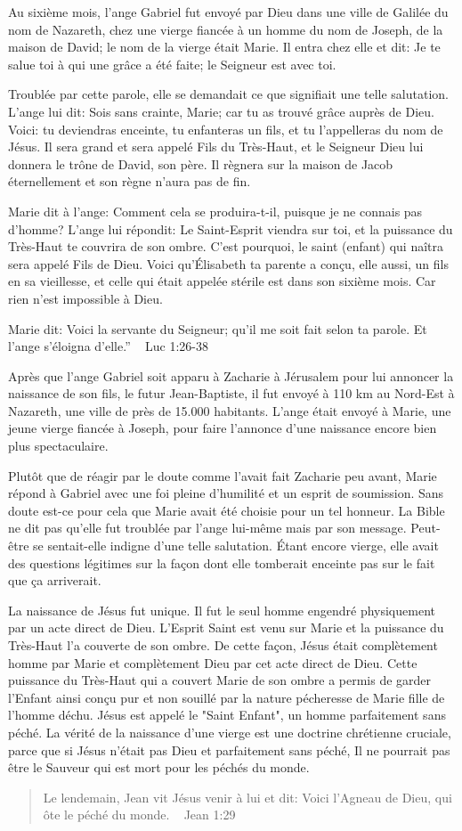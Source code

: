 
\epigraph{Au sixième mois, l’ange Gabriel fut envoyé par Dieu dans une ville de Galilée du nom de Nazareth, chez une vierge fiancée à un homme du nom de Joseph, de la maison de David; le nom de la vierge était Marie. Il entra chez elle et dit: Je te salue toi à qui une grâce a été faite; le Seigneur est avec toi.}{}

Troublée par cette parole, elle se demandait ce que signifiait une telle salutation. L’ange lui dit: Sois sans crainte, Marie; car tu as trouvé grâce auprès de Dieu. Voici: tu deviendras enceinte, tu enfanteras un fils, et tu l’appelleras du nom de Jésus. Il sera grand et sera appelé Fils du Très-Haut, et le Seigneur Dieu lui donnera le trône de David, son père. Il règnera sur la maison de Jacob éternellement et son règne n’aura pas de fin.

Marie dit à l’ange: Comment cela se produira-t-il, puisque je ne connais pas d’homme? L’ange lui répondit: Le Saint-Esprit viendra sur toi, et la puissance du Très-Haut te couvrira de son ombre. C’est pourquoi, le saint (enfant) qui naîtra sera appelé Fils de Dieu. Voici qu’Élisabeth ta parente a conçu, elle aussi, un fils en sa vieillesse, et celle qui était appelée stérile est dans son sixième mois. Car rien n’est impossible à Dieu.

Marie dit: Voici la servante du Seigneur; qu’il me soit fait selon ta parole. Et l’ange s’éloigna d’elle.” ~ Luc 1:26-38

Après que l'ange Gabriel soit apparu à Zacharie à Jérusalem pour lui annoncer la naissance de son fils, le futur Jean-Baptiste, il fut envoyé à 110 km au Nord-Est à Nazareth, une ville de près de 15.000 habitants. L'ange était envoyé à Marie, une jeune vierge fiancée à Joseph, pour faire l'annonce d'une naissance encore bien plus spectaculaire.

Plutôt que de réagir par le doute comme l'avait fait Zacharie peu avant, Marie répond à Gabriel avec une foi pleine d'humilité et un esprit de soumission. Sans doute est-ce pour cela que Marie avait été choisie pour un tel honneur. La Bible ne dit pas qu'elle fut troublée par l'ange lui-même mais par son message. Peut-être se sentait-elle indigne d'une telle salutation. Étant encore vierge, elle avait des questions légitimes sur la façon dont elle tomberait enceinte pas sur le fait que ça arriverait.

La naissance de Jésus fut unique. Il fut le seul homme engendré physiquement par un acte direct de Dieu. L'Esprit Saint est venu sur Marie et la puissance du Très-Haut l'a couverte de son ombre. De cette façon, Jésus était complètement homme par Marie et complètement Dieu par cet acte direct de Dieu. Cette puissance du Très-Haut qui a couvert Marie de son ombre a permis de garder l'Enfant ainsi conçu pur et non souillé par la nature pécheresse de Marie fille de l'homme déchu. Jésus est appelé le "Saint Enfant", un homme parfaitement sans péché. La vérité de la naissance d'une vierge est une doctrine chrétienne cruciale, parce que si Jésus n'était pas Dieu et parfaitement sans péché, Il ne pourrait pas être le Sauveur qui est mort pour les péchés du monde.

\begin{quote}
Le lendemain, Jean vit Jésus venir à lui et dit: Voici l’Agneau de Dieu, qui ôte le péché du monde. ~ Jean 1:29
\end{quote}

